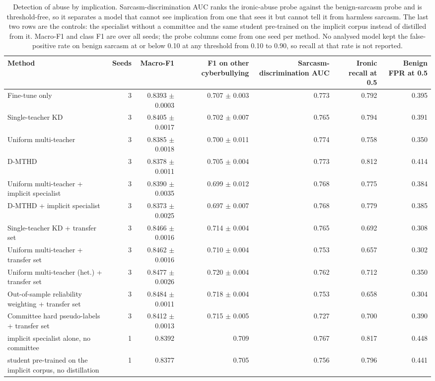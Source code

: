 \begin{table}[t]
\centering
\caption{Detection of abuse by implication. Sarcasm-discrimination AUC ranks the ironic-abuse probe against the benign-sarcasm probe and is threshold-free, so it separates a model that cannot see implication from one that sees it but cannot tell it from harmless sarcasm. The last two rows are the controls: the specialist without a committee and the same student pre-trained on the implicit corpus instead of distilled from it. Macro-F1 and class F1 are over all seeds; the probe columns come from one seed per method. No analysed model kept the false-positive rate on benign sarcasm at or below 0.10 at any threshold from 0.10 to 0.90, so recall at that rate is not reported.}
\label{tab:implicit}
\begin{tabular}{lrrrrrr}
\toprule
Method & Seeds & Macro-F1 & F1 on other cyberbullying & Sarcasm-discrimination AUC & Ironic recall at 0.5 & Benign FPR at 0.5 \\
\midrule
Fine-tune only & 3 & 0.8393 $\pm$ 0.0003 & 0.707 $\pm$ 0.003 & 0.773 & 0.792 & 0.395 \\
Single-teacher KD & 3 & 0.8405 $\pm$ 0.0017 & 0.702 $\pm$ 0.007 & 0.765 & 0.794 & 0.391 \\
Uniform multi-teacher & 3 & 0.8385 $\pm$ 0.0018 & 0.700 $\pm$ 0.011 & 0.774 & 0.758 & 0.350 \\
D-MTHD & 3 & 0.8378 $\pm$ 0.0011 & 0.705 $\pm$ 0.004 & 0.773 & 0.812 & 0.414 \\
Uniform multi-teacher + implicit specialist & 3 & 0.8390 $\pm$ 0.0035 & 0.699 $\pm$ 0.012 & 0.768 & 0.775 & 0.384 \\
D-MTHD + implicit specialist & 3 & 0.8373 $\pm$ 0.0025 & 0.697 $\pm$ 0.007 & 0.768 & 0.779 & 0.385 \\
Single-teacher KD + transfer set & 3 & 0.8466 $\pm$ 0.0016 & 0.714 $\pm$ 0.004 & 0.765 & 0.692 & 0.308 \\
Uniform multi-teacher + transfer set & 3 & 0.8462 $\pm$ 0.0016 & 0.710 $\pm$ 0.004 & 0.753 & 0.657 & 0.302 \\
Uniform multi-teacher (het.) + transfer set & 3 & 0.8477 $\pm$ 0.0026 & 0.720 $\pm$ 0.004 & 0.762 & 0.712 & 0.350 \\
Out-of-sample reliability weighting + transfer set & 3 & 0.8484 $\pm$ 0.0011 & 0.718 $\pm$ 0.004 & 0.753 & 0.658 & 0.304 \\
Committee hard pseudo-labels + transfer set & 3 & 0.8412 $\pm$ 0.0013 & 0.715 $\pm$ 0.005 & 0.727 & 0.700 & 0.390 \\
implicit specialist alone, no committee & 1 & 0.8392 & 0.709 & 0.767 & 0.817 & 0.448 \\
student pre-trained on the implicit corpus, no distillation & 1 & 0.8377 & 0.705 & 0.756 & 0.796 & 0.441 \\
\bottomrule
\end{tabular}
\end{table}